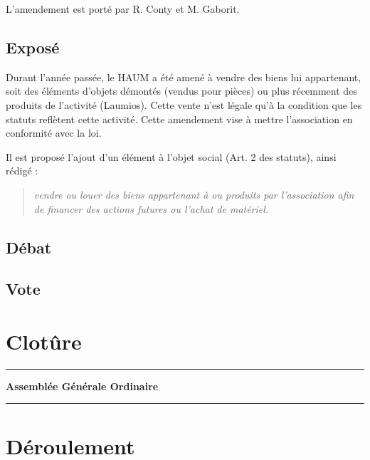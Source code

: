 \documentclass[11pt,twosided]{article}
\begin{document}
L'amendement est porté par R. Conty et M. Gaborit.

\subsection{Exposé}

Durant l'année passée, le HAUM a été amené à vendre des biens lui appartenant, soit des éléments d'objets démontés (vendus pour pièces) ou plus récemment des produits de l'activité (Laumios). Cette vente n'est légale qu'à la condition que les statuts reflètent cette activité. Cette amendement vise à mettre l'association en conformité avec la loi.

Il est proposé l'ajout d'un élément à l'objet social (Art. 2 des statuts), ainsi rédigé :

\begin{quotation}
\itshape vendre ou louer des biens appartenant à ou produits par l'association afin de financer des actions futures ou l'achat de matériel.
\end{quotation}

\subsection{Débat}
\subsection{Vote}

\section*{Clotûre}

\pagebreak

\vspace{1.5cm}

\hrule
\begin{center}
\Large\bfseries Assemblée Générale Ordinaire
\end{center}
\hrule

\vspace{1.5cm}

\section*{Déroulement}
\end{document}
